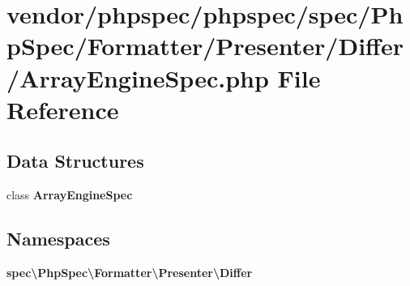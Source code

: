 \section{vendor/phpspec/phpspec/spec/\+Php\+Spec/\+Formatter/\+Presenter/\+Differ/\+Array\+Engine\+Spec.php File Reference}
\label{_array_engine_spec_8php}
\subsection*{Data Structures}
\begin{DoxyCompactItemize}
\item 
class {\bf Array\+Engine\+Spec}
\end{DoxyCompactItemize}
\subsection*{Namespaces}
\begin{DoxyCompactItemize}
\item 
 {\bf spec\textbackslash{}\+Php\+Spec\textbackslash{}\+Formatter\textbackslash{}\+Presenter\textbackslash{}\+Differ}
\end{DoxyCompactItemize}
